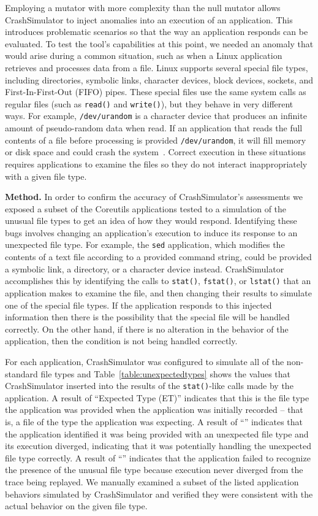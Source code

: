 Employing a mutator
with more complexity than the null mutator
allows CrashSimulator to inject anomalies into an execution
of an application.
This introduces problematic scenarios
so that the way an application responds
can be evaluated.
To test
the tool's capabilities
at this point,
we needed an anomaly
that would arise during a common situation,
such as when a Linux application retrieves
and processes data from a file.
Linux supports
several special file types,
including
directories,
symbolic links,
character devices,
block devices,
sockets, and
First-In-First-Out (FIFO) pipes.
These special files
use the same system calls
as regular files
(such as {\tt read()} and {\tt write()}),
but they behave in very different ways.
For example,
{\tt /dev/urandom} is a character device
that produces an infinite amount
of pseudo-random data
when read.
If an application that reads the full
contents of a file before processing is provided {\tt /dev/urandom}, it
will fill memory or disk space and could
crash the system~\cite{YumAptEndless}.
Correct execution in these situations
requires applications
to examine the files so they do not
interact inappropriately with a given file type.

{\bf Method.}
In order to confirm the accuracy of CrashSimulator's assessments we
exposed a subset of the Coreutils applications tested to
a simulation of the unusual file
types to get an idea of how they would respond.
Identifying these bugs involves changing an application's
execution to induce its response to an unexpected file type.  For
example, the {\tt sed} application, which modifies the contents of a text
file according to a provided command string, could be provided a symbolic
link, a directory, or a character device instead.  CrashSimulator
accomplishes this by identifying the calls to {\tt stat()}, {\tt fstat()},
or {\tt lstat()} that an application makes to examine the file, and then
changing their results to simulate
one of the special file types.  If the application responds to
this injected information then there is the possibility that the special
file will be handled correctly.  On the other hand, if there is no
alteration in the behavior of the application,  then the condition is not
being handled correctly.

For each application,
CrashSimulator was configured to simulate all of the non-standard file
types and
Table~\ref{table:unexpectedtypes} shows the values that CrashSimulator
inserted into the results of the {\tt stat()}-like calls made by the
application.
A result of ``Expected Type (ET)'' indicates
that this is the file type the application was provided
when the application was initially recorded -- that is,
a file of the type the application was expecting.
A result of ``\tickmark'' indicates that the application
identified it was being provided with an unexpected file type and its
execution diverged,
indicating that it was potentially handling the
unexpected file type correctly.
A result of ``\xmark'' indicates that the
application failed to recognize the presence of the unusual file type
because execution never diverged from the trace being replayed.
We manually examined a subset of the listed application behaviors simulated by
CrashSimulator and verified they were consistent with the actual behavior
on the given file type.

